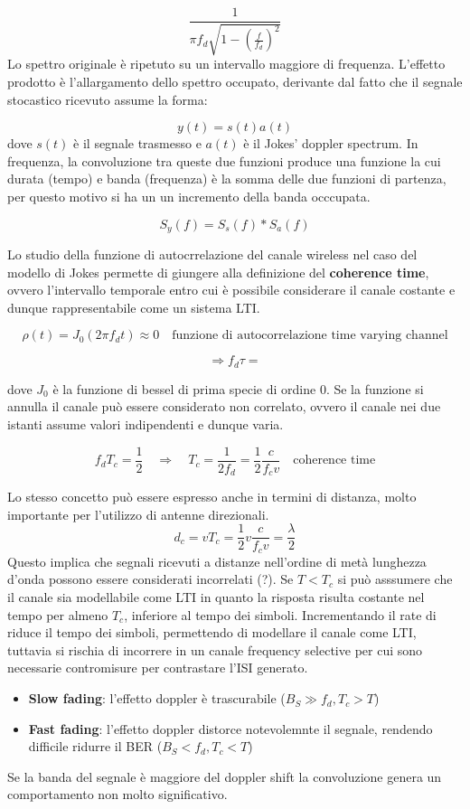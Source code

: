 \[
  \frac{1}{\pi f_d \sqrt{1 - \left(\frac{f}{f_d}\right)^2}}
\]
Lo spettro originale è ripetuto su un intervallo maggiore di frequenza. L'effetto prodotto è l'allargamento dello spettro occupato, derivante dal fatto che il segnale stocastico ricevuto assume la forma:

\[
    y(t) = s(t) a(t)
\]
dove $s(t)$ è il segnale trasmesso e $a(t)$ è il Jokes' doppler spectrum. In frequenza, la convoluzione tra queste due funzioni produce una funzione la cui durata (tempo) e banda (frequenza) è la somma delle due funzioni di partenza, per questo motivo si ha un un incremento della banda occcupata.

\[
    S_y(f) = S_s(f) \ast S_a(f) 
\]

Lo studio della funzione di autocrrelazione del canale wireless nel caso del modello di Jokes permette di giungere alla definizione del \textbf{coherence time}, ovvero l'intervallo temporale entro cui è possibile considerare il canale costante e dunque rappresentabile come un sistema LTI.

\[
    \rho (t) = J_0(2\pi f_d t) \approx 0 \quad \text{funzione di autocorrelazione time varying channel}
\]

\[
    \Rightarrow f_d \tau = 
\]


dove $J_0$ è la funzione di bessel di prima specie di ordine 0.  Se la funzione si annulla il canale può essere considerato non correlato, ovvero il canale nei due istanti assume valori indipendenti e dunque varia.


\[
    f_d T_c = \frac{1}{2} \quad \Rightarrow \quad  T_c = \frac{1}{2 f_d} = \frac{1}{2} \frac{c}{f_c v} \quad \text{coherence time}
\]

Lo stesso concetto può essere espresso anche in termini di distanza, molto importante per l'utilizzo di antenne direzionali.
\[
    d_c = v T_c = \frac{1}{2} v \frac{c}{f_c v} = \frac{\lambda}{2}
\]
Questo implica che segnali ricevuti a distanze nell'ordine di metà lunghezza d'onda possono essere considerati incorrelati (?).
Se $T < T_c$ si può asssumere che il canale sia modellabile come LTI in quanto la risposta risulta costante nel tempo per almeno $T_c$, inferiore al tempo dei simboli.
Incrementando il rate di riduce il tempo dei simboli, permettendo di modellare il canale come LTI, tuttavia si rischia di incorrere in un canale frequency selective per cui sono necessarie contromisure per contrastare l'ISI generato.  

\begin{itemize}
    \item \textbf{Slow fading}: l'effetto doppler è trascurabile ($B_S \gg f_d, T_c > T$)
    \item \textbf{Fast fading}: l'effetto doppler distorce notevolemnte il segnale, rendendo difficile ridurre il BER ($B_S < f_d, T_c < T$)
\end{itemize}
Se la banda del segnale è maggiore del doppler shift la convoluzione genera un comportamento non molto significativo.

